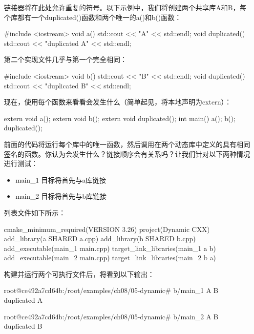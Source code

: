链接器将在此处允许重复的符号。以下示例中，我们将创建两个共享库A和B，每个库都有一个duplicated()函数和两个唯一的a()和b()函数：


\begin{cpp}
#include <iostream>
void a() {
    std::cout << "A" << std::endl;
}
void duplicated() {
    std::cout << "duplicated A" << std::endl;
}
\end{cpp}

第二个实现文件几乎与第一个完全相同：


\begin{cpp}
#include <iostream>
void b() {
    std::cout << "B" << std::endl;
}
void duplicated() {
    std::cout << "duplicated B" << std::endl;
}
\end{cpp}

现在，使用每个函数来看看会发生什么（简单起见，将本地声明为extern）：


\begin{cpp}
extern void a();
extern void b();
extern void duplicated();
int main() {
    a();
    b();
    duplicated();
}
\end{cpp}

前面的代码将运行每个库中的唯一函数，然后调用在两个动态库中定义的具有相同签名的函数。你认为会发生什么？链接顺序会有关系吗？让我们针对以下两种情况进行测试：

\begin{itemize}
\item
main\_1 目标将首先与a库链接

\item
main\_2 目标将首先与b库链接
\end{itemize}

列表文件如下所示：


\begin{cmake}
cmake_minimum_required(VERSION 3.26)
project(Dynamic CXX)
add_library(a SHARED a.cpp)
add_library(b SHARED b.cpp)
add_executable(main_1 main.cpp)
target_link_libraries(main_1 a b)
add_executable(main_2 main.cpp)
target_link_libraries(main_2 b a)
\end{cmake}

构建并运行两个可执行文件后，将看到以下输出：

\begin{shell}
root@ce492a7cd64b:/root/examples/ch08/05-dynamic# b/main_1
A
B
duplicated A

root@ce492a7cd64b:/root/examples/ch08/05-dynamic# b/main_2
A
B
duplicated B
\end{shell}

